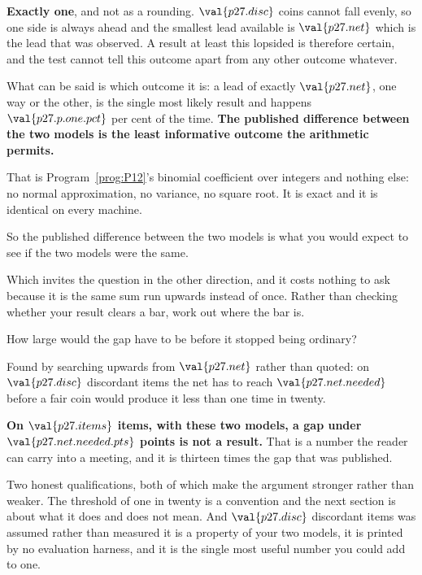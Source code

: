 \begin{fr}


\textbf{Exactly one}, and not as a rounding. $\val{p27.disc}$ coins cannot fall
evenly, so one side is always ahead and the smallest lead available is
$\val{p27.net}$ \dash{} which is the lead that was observed. A result at
least this lopsided is therefore certain, and the test cannot tell this
outcome apart from any other outcome whatever.

What can be said is which outcome it is: a lead of exactly $\val{p27.net}$,
one way or the other, is the single most likely result and happens
$\val{p27.p.one.pct}$ per cent of the time. \textbf{The published difference
between the two models is the least informative outcome the arithmetic
permits.}

That is Program~\ref{prog:P12}'s binomial coefficient over integers and
nothing else: no normal approximation, no variance, no square root. It is
exact and it is identical on every machine.

So the published difference between the two models is what you would expect
to see if the two models were the same.

Which invites the question in the other direction, and it costs nothing to ask
because it is the same sum run upwards instead of once. Rather than checking
whether your result clears a bar, work out where the bar is.

How large would the gap have to be before it stopped being ordinary?
\dotline
\nextframe
\end{fr}

\begin{fr}

Found by searching upwards from $\val{p27.net}$ rather than quoted: on
$\val{p27.disc}$ discordant items the net has to reach
$\val{p27.net.needed}$ before a fair coin would produce it less than one time
in twenty.

\textbf{On $\val{p27.items}$ items, with these two models, a gap under
$\val{p27.net.needed.pts}$ points is not a result.} That is a number the
reader can carry into a meeting, and it is thirteen times the gap that was
published.

Two honest qualifications, both of which make the argument stronger rather
than weaker. The threshold of one in twenty is a convention and the next
section is about what it does and does not mean. And $\val{p27.disc}$
discordant items was assumed rather than measured \dash{} it is a property of
your two models, it is printed by no evaluation harness, and it is the single
most useful number you could add to one.
\end{fr}

